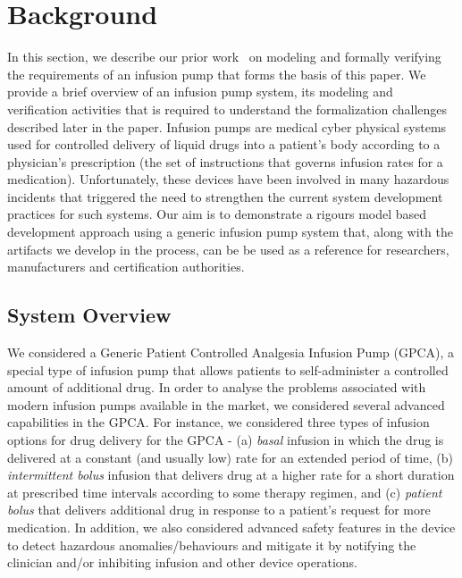 \section{Background}
\label{sec:gpca-overview}

In this section, we describe our prior work~\cite{hilt2013, req2code} on modeling and formally verifying the requirements of an infusion pump that forms the basis of this paper. We provide a brief overview of an infusion pump system, its modeling and verification activities that is required to understand the formalization challenges described later in the paper. Infusion pumps are medical cyber physical systems used for controlled delivery of liquid drugs into a patient's body according to a physician's prescription (the set of instructions that governs infusion rates for a medication). Unfortunately, these devices have been involved in many hazardous incidents that triggered the need to strengthen the current system development practices for such systems. Our aim is to demonstrate a rigours model based development approach using a generic infusion pump system that, along with the artifacts we develop in the process, can be be used as a reference for researchers, manufacturers and certification authorities.

\subsection {System Overview}
We considered a Generic Patient Controlled Analgesia Infusion Pump (GPCA), a special type of infusion pump that allows patients to self-administer a controlled amount of additional drug. %
In order to analyse the problems associated with modern infusion pumps available in the market, we considered several advanced capabilities in the GPCA. For instance, we considered three types of infusion options for drug delivery for the GPCA - (a) \emph{basal} infusion in which the drug is delivered at a constant (and usually low) rate for an extended period of
time, (b) \emph{intermittent bolus} infusion that delivers drug at a higher rate for a short duration at prescribed time intervals according to some therapy regimen, and (c) \emph{patient bolus} that delivers additional drug in response to a patient's request for more medication. In addition, we also considered advanced safety features in the device to detect hazardous anomalies/behaviours and mitigate it by notifying the clinician and/or inhibiting infusion and other device operations.

